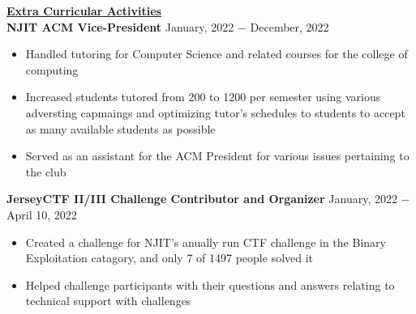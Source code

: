 \documentclass{article}
\begin{document}
\noindent \textbf{\underline{Extra Curricular Activities}} \\
\noindent \textbf{NJIT ACM Vice-President} \hfill January, 2022 $-$ December, 2022
\begin{itemize}[noitemsep,nolistsep,leftmargin=*]
\item {Handled tutoring for Computer Science and related courses for the college of computing}
\item {Increased students tutored from 200 to 1200 per semester using various adversting capmaings and optimizing tutor's schedules to students to accept as many available students as possible}
\item {Served as an assistant for the ACM President for various issues pertaining to the club\\}
\end{itemize}

\noindent \textbf{JerseyCTF II/III Challenge Contributor and Organizer} \hfill January, 2022 $-$ April 10, 2022
\begin{itemize}[noitemsep,nolistsep,leftmargin=*]
\item {Created a challenge for NJIT's anually run CTF challenge in the Binary Exploitation catagory, and only 7 of 1497 people solved it}
\item {Helped challenge participants with their questions and answers relating to technical support with challenges}
\end{itemize}

\end{document}
